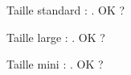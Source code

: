\documentclass[varwidth, border = 3pt]{standalone}
\begin{document}
Taille standard : \iconpec. OK ?

\Large

Taille large : \iconpec. OK ?

\tiny

Taille mini : \iconpec. OK ?
\end{document}
